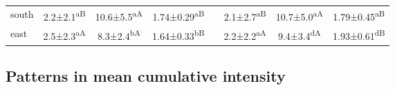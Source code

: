 \documentclass[a4paper,10pt,review]{elsarticle}
\begin{document}
\begin{table}[]
\begin{tiny}
\begin{tabular}{lccccccc}
south & 2.2±2.1\textsuperscript{aB} & 10.6±5.5\textsuperscript{aA} & 1.74±0.29\textsuperscript{aB} && 2.1±2.7\textsuperscript{aB} & 10.7±5.0\textsuperscript{aA} & 1.79±0.45\textsuperscript{aB} \\
east & 2.5±2.3\textsuperscript{aA} & 8.3±2.4\textsuperscript{bA} & 1.64±0.33\textsuperscript{bB} && 2.2±2.2\textsuperscript{aA} & 9.4±3.4\textsuperscript{dA} & 1.93±0.61\textsuperscript{dB} \\
\bottomrule
\end{tabular}
\end{tiny}
\end{table}

\subsection{Patterns in mean cumulative intensity}
\end{document}
